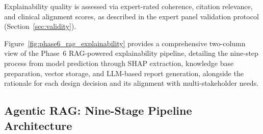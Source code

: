 Explainability quality is assessed via expert-rated coherence, citation relevance, and clinical alignment scores, as described in the expert panel validation protocol (Section~\ref{sec:validity}).

Figure~\ref{fig:phase6_rag_explainability} provides a comprehensive two-column view of the Phase~6 RAG-powered explainability pipeline, detailing the nine-step process from model prediction through SHAP extraction, knowledge base preparation, vector storage, and LLM-based report generation, alongside the rationale for each design decision and its alignment with multi-stakeholder needs.



\subsection{Agentic RAG: Nine-Stage Pipeline Architecture}
\label{app_sec:agentic_rag_architecture}

